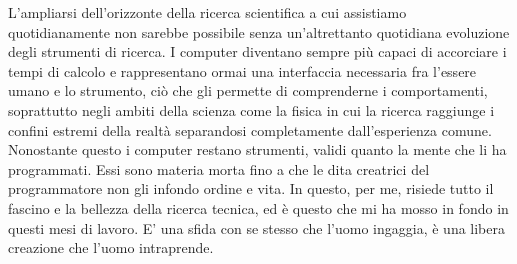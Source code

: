 \documentclass[../main.tex]{subfiles}
\begin{document}
L'ampliarsi dell'orizzonte della ricerca scientifica a cui assistiamo quotidianamente non sarebbe possibile senza un'altrettanto quotidiana evoluzione degli strumenti di ricerca. I computer diventano sempre più capaci di accorciare i tempi di calcolo e rappresentano ormai una interfaccia necessaria fra l'essere umano e lo strumento, ciò che gli permette di comprenderne i comportamenti, soprattutto negli ambiti della scienza come la fisica in cui la ricerca raggiunge i confini estremi della realtà separandosi completamente dall'esperienza comune. Nonostante questo i computer restano strumenti, validi quanto la mente che li ha programmati. Essi sono materia morta fino a che le dita creatrici del programmatore non gli infondo ordine e vita. In questo, per me, risiede tutto il fascino e la bellezza della ricerca tecnica, ed è questo che mi ha mosso in fondo in questi mesi di lavoro. E' una sfida con se stesso che l'uomo ingaggia, è una libera creazione che l'uomo intraprende.
\end{document}
